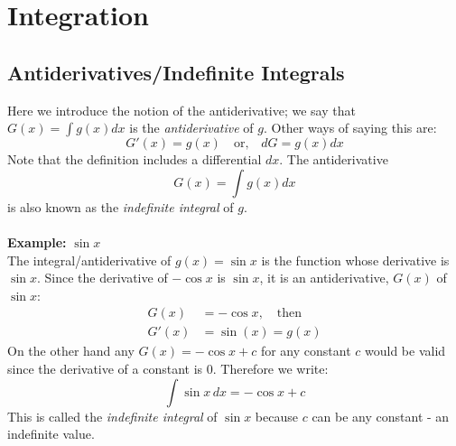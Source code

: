 \documentclass{report}
\begin{document}

\section{Integration}
\subsection{Antiderivatives/Indefinite Integrals} %
Here we introduce the notion of the antiderivative; we say 
that $G(x)=\int g(x)dx$ is the \textit{antiderivative} of $g$. Other ways of saying this are:
\begin{equation*}
G'(x)=g(x)\quad\text{or,}\quad dG=g(x)dx
\end{equation*}
Note that the definition includes a differential $dx$.
The antiderivative
\begin{equation*}
G(x)=\int g(x)dx
\end{equation*}
is also known as the \textit{indefinite integral} of $g$.\\
\vspace{1mm}\\
\textbf{Example:} $\sin x$\\
The integral/antiderivative of $g(x)=\sin x$ is the function whose derivative
is $\sin x$. Since the derivative of $-\cos x$ is $\sin x$, it is an antiderivative, $G(x)$ of $\sin x$:
\begin{align*}
G(x)&=-\cos x,\quad\text{then}\\
G'(x)&=\sin(x)=g(x)
\end{align*}
On the other hand any $G(x)=-\cos x+c$ for any constant $c$ would be valid
since the derivative of a constant is 0. Therefore we write:
\begin{equation*}
\int\sin x\,dx=-\cos x+c
\end{equation*}
This is called the \textit{indefinite integral} of $\sin x$ because $c$ can be any
constant - an indefinite value.
\newpage
\end{document}
